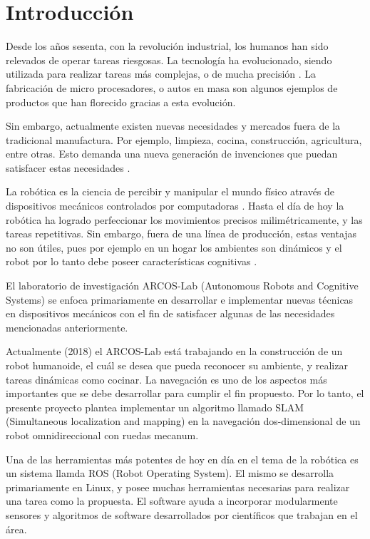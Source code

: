   \chapter{Introducción}
\label{C:introduccion}



Desde los años sesenta, con la revolución industrial, los humanos han sido relevados de operar tareas riesgosas. La tecnología ha evolucionado, siendo utilizada para realizar tareas más complejas, o de mucha precisión \cite{Garcia2007}. La fabricación de micro procesadores, o autos en masa son algunos ejemplos de productos que han florecido gracias a esta evolución.

Sin embargo, actualmente existen nuevas necesidades y mercados fuera de la tradicional manufactura. Por ejemplo, limpieza, cocina, construcción, agricultura, entre otras. Esto demanda una nueva generación de invenciones que puedan satisfacer estas necesidades \cite{Garcia2007}.

La robótica es la ciencia de percibir y manipular el mundo físico através de dispositivos mecánicos controlados por computadoras \cite{Thrun2005}. Hasta el día de hoy la robótica ha logrado perfeccionar los movimientos precisos milimétricamente, y las tareas repetitivas. Sin embargo, fuera de una línea de producción, estas ventajas no son útiles, pues por ejemplo en un hogar los ambientes son dinámicos y el robot por lo tanto debe poseer características cognitivas \cite{HelioAzevedoRenatoArcherITCenterandICM/USPJosePedroR.InstituteofMathematicalandComputerSciences2017}.

El laboratorio de investigación ARCOS-Lab (Autonomous Robots and Cognitive Systems) se enfoca primariamente en desarrollar e implementar nuevas técnicas en dispositivos mecánicos con el fin de satisfacer algunas de las necesidades mencionadas anteriormente.

Actualmente (2018) el ARCOS-Lab está trabajando en la construcción de un robot humanoide, el cuál se desea que pueda reconocer su ambiente, y realizar tareas dinámicas como cocinar. La navegación es uno de los aspectos más importantes que se debe desarrollar para cumplir el fin propuesto. Por lo tanto, el presente proyecto plantea implementar un algoritmo llamado SLAM (Simultaneous localization and mapping) en la navegación dos-dimensional de un robot omnidireccional con ruedas mecanum.

Una de las herramientas más potentes de hoy en día en el tema de la robótica es un sistema llamda ROS (Robot Operating System). El mismo se desarrolla primariamente en Linux, y posee muchas herramientas necesarias para realizar una tarea como la propuesta. El software ayuda a incorporar modularmente sensores y algoritmos de software desarrollados por científicos que trabajan en el área.

